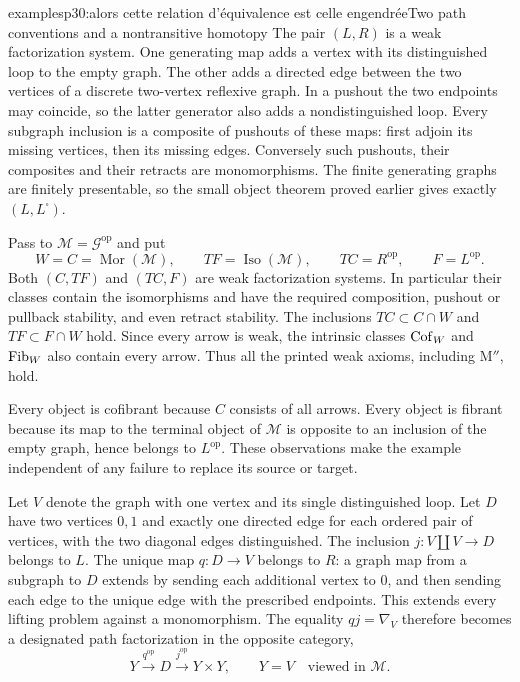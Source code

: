 \begin{dcomment}{examples}{p30:alors cette relation d'équivalence est celle engendrée}{Two path conventions and a nontransitive homotopy}
The pair $(L,R)$ is a weak factorization system. One generating map adds a vertex with its distinguished loop to the empty graph. The other adds a directed edge between the two vertices of a discrete two-vertex reflexive graph. In a pushout the two endpoints may coincide, so the latter generator also adds a nondistinguished loop. Every subgraph inclusion is a composite of pushouts of these maps: first adjoin its missing vertices, then its missing edges. Conversely such pushouts, their composites and their retracts are monomorphisms. The finite generating graphs are finitely presentable, so the small object theorem proved earlier gives exactly $(L,L^{\square})$.

Pass to $\mathcal M=\mathcal G^{\mathrm{op}}$ and put
\[
 W=C=\operatorname{Mor}(\mathcal M),\qquad TF=\operatorname{Iso}(\mathcal M),
 \qquad TC=R^{\mathrm{op}},\qquad F=L^{\mathrm{op}}.
\]
Both $(C,TF)$ and $(TC,F)$ are weak factorization systems. In particular their classes contain the isomorphisms and have the required composition, pushout or pullback stability, and even retract stability. The inclusions $TC\subset C\cap W$ and $TF\subset F\cap W$ hold. Since every arrow is weak, the intrinsic classes $\mathrm{Cof}_W$ and $\mathrm{Fib}_W$ also contain every arrow. Thus all the printed weak axioms, including $\text{M}''$, hold.

Every object is cofibrant because $C$ consists of all arrows. Every object is fibrant because its map to the terminal object of $\mathcal M$ is opposite to an inclusion of the empty graph, hence belongs to $L^{\mathrm{op}}$. These observations make the example independent of any failure to replace its source or target.

Let $V$ denote the graph with one vertex and its single distinguished loop. Let $D$ have two vertices $0,1$ and exactly one directed edge for each ordered pair of vertices, with the two diagonal edges distinguished. The inclusion $j:V\amalg V\to D$ belongs to $L$. The unique map $q:D\to V$ belongs to $R$: a graph map from a subgraph to $D$ extends by sending each additional vertex to $0$, and then sending each edge to the unique edge with the prescribed endpoints. This extends every lifting problem against a monomorphism. The equality $qj=\nabla_V$ therefore becomes a designated path factorization in the opposite category,
\[
 Y\xrightarrow{q^{\mathrm{op}}}D
     \xrightarrow{j^{\mathrm{op}}}Y\times Y,
 \qquad Y=V\quad\text{viewed in }\mathcal M.
\]


\end{dcomment}
